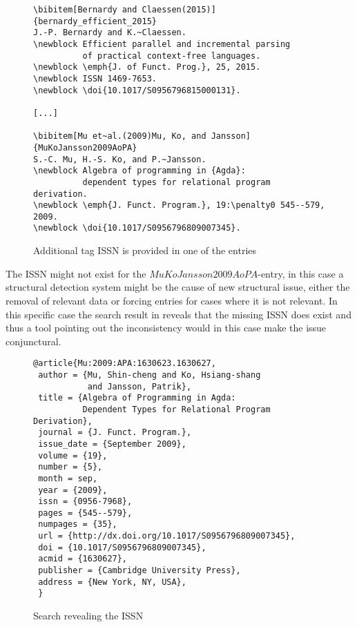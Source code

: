\begin{figure}
  \centering
  \begin{small}
\begin{verbatim}
\bibitem[Bernardy and Claessen(2015)]{bernardy_efficient_2015}
J.-P. Bernardy and K.~Claessen.
\newblock Efficient parallel and incremental parsing
          of practical context-free languages.
\newblock \emph{J. of Funct. Prog.}, 25, 2015.
\newblock ISSN 1469-7653.
\newblock \doi{10.1017/S0956796815000131}.

[...]

\bibitem[Mu et~al.(2009)Mu, Ko, and Jansson]{MuKoJansson2009AoPA}
S.-C. Mu, H.-S. Ko, and P.~Jansson.
\newblock Algebra of programming in {Agda}:
          dependent types for relational program derivation.
\newblock \emph{J. Funct. Program.}, 19:\penalty0 545--579, 2009.
\newblock \doi{10.1017/S0956796809007345}.
\end{verbatim}
  \end{small}
  \caption{Additional tag ISSN is provided in one of the entries}
\label{fig:entry_with_issn}
\end{figure}

The ISSN might not exist for the $MuKoJansson2009AoPA$-entry, in this
case a structural detection system might be the cause of new
structural issue, either the removal of relevant data or forcing
entries for cases where it is not relevant.  In this specific case the
search result in  reveals that the
missing ISSN does exist and thus a tool pointing out the inconsistency
would in this case make the issue conjunctural.

\begin{figure}
  \centering
\begin{verbatim}
@article{Mu:2009:APA:1630623.1630627,
 author = {Mu, Shin-cheng and Ko, Hsiang-shang 
           and Jansson, Patrik},
 title = {Algebra of Programming in Agda: 
          Dependent Types for Relational Program Derivation},
 journal = {J. Funct. Program.},
 issue_date = {September 2009},
 volume = {19},
 number = {5},
 month = sep,
 year = {2009},
 issn = {0956-7968},
 pages = {545--579},
 numpages = {35},
 url = {http://dx.doi.org/10.1017/S0956796809007345},
 doi = {10.1017/S0956796809007345},
 acmid = {1630627},
 publisher = {Cambridge University Press},
 address = {New York, NY, USA},
 }
\end{verbatim}
  \caption{Search revealing the ISSN}
\label{fig:entry_issn_found}
\end{figure}

